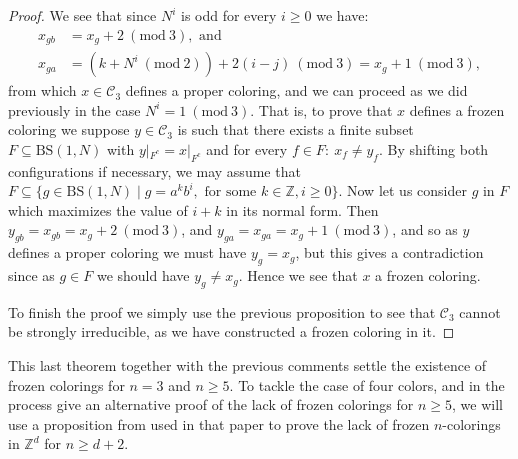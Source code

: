 \documentclass[cupthm,crop,info]{CUP-JNL-ETS}%
\theoremstyle{cupplain}
\theoremstyle{cupdefinition}
\theoremstyle{cupremark}
\theoremstyle{cupproof}
\newtheorem{proof}{Proof}
\numberwithin{equation}{section}
\newcommand{\BS}[1][N]{\mathrm{BS}(1,#1)}
\begin{document}
\begin{proof}
	We see that since $N^i$ is odd for every $i\ge 0$ we have:
	\begin{align*}
	x_{gb}&=x_g+2\ (\mathrm{mod} \ 3), \text{ and} \\
	x_{ga}&=(k+N^i \ (\mathrm{mod} \ 2)) + 2(i-j) \ (\mathrm{mod} \ 3)=x_g+1 \ (\mathrm{mod} \ 3),
	\end{align*}
	from which $x\in \mathcal{C}_3$ defines a proper coloring, and we can proceed as we did previously in the case $N^i=1\ (\mathrm{mod} \ 3)$. That is, to prove that $x$ defines a frozen coloring we suppose $y\in \mathcal{C}_3$ is such that there exists a finite subset $F\subseteq \BS$ with $y|_{F^ c}=x|_{F^c}$ and for every $f\in F: \ x_f\neq y_f$. By shifting both configurations if necessary, we may assume that $F\subseteq \{g\in \BS\mid g=a^kb^i, \text{ for some }k\in \mathbb{Z}, i\ge 0\}$. Now let us consider $g$ in $F$ which maximizes the value of $i+k$ in its normal form. Then $y_{gb}=x_{gb}=x_g+2\ (\mathrm{mod} \ 3)$, and $y_{ga}=x_{ga}=x_g+1\ (\mathrm{mod} \ 3)$, and so as $y$ defines a proper coloring we must have $y_g=x_g$, but this gives a contradiction since as $g\in F$ we should have $y_g\neq x_g$. Hence we see that $x$ a frozen coloring.
	
	To finish the proof we simply use the previous proposition to see that $\mathcal{C}_3$ cannot be strongly irreducible, as we have constructed a frozen coloring in it.
\end{proof}

This last theorem together with the previous comments settle the existence of frozen colorings for $n=3$ and $n\ge 5$. To tackle the case of four colors, and in the process give an alternative proof of the lack of frozen colorings for $n\ge 5$, we will use a proposition from \cite{alon2019mixing} used in that paper to prove the lack of frozen $n$-colorings in $\mathbb{Z}^d$ for $n\ge d+2$.
\end{document}
